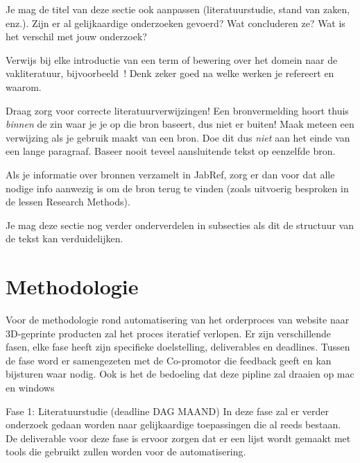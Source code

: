Je mag de titel van deze sectie ook aanpassen (literatuurstudie, stand van zaken, enz.). Zijn er al gelijkaardige onderzoeken gevoerd? Wat concluderen ze? Wat is het verschil met jouw onderzoek?

Verwijs bij elke introductie van een term of bewering over het domein naar de vakliteratuur, bijvoorbeeld~\autocite{Hykes2013}! Denk zeker goed na welke werken je refereert en waarom.

Draag zorg voor correcte literatuurverwijzingen! Een bronvermelding hoort thuis \emph{binnen} de zin waar je je op die bron baseert, dus niet er buiten! Maak meteen een verwijzing als je gebruik maakt van een bron. Doe dit dus \emph{niet} aan het einde van een lange paragraaf. Baseer nooit teveel aansluitende tekst op eenzelfde bron.

Als je informatie over bronnen verzamelt in JabRef, zorg er dan voor dat alle nodige info aanwezig is om de bron terug te vinden (zoals uitvoerig besproken in de lessen Research Methods).


Je mag deze sectie nog verder onderverdelen in subsecties als dit de structuur van de tekst kan verduidelijken.

\section{Methodologie}%
\label{sec:methodologie}

Voor de methodologie rond automatisering van het orderproces van website naar 3D-geprinte producten zal het proces iteratief verlopen. Er zijn verschillende fasen, elke fase heeft zijn specifieke doelstelling, deliverables en deadlines. Tussen de fase word er samengezeten met de Co-promotor die feedback geeft en kan bijsturen waar nodig. Ook is het de bedoeling dat deze pipline zal draaien op mac en windows 

Fase 1: Literatuurstudie (deadline DAG MAAND)
In deze fase zal er verder onderzoek gedaan worden naar gelijkaardige toepassingen die al reeds bestaan. De deliverable voor deze fase is ervoor zorgen dat er een lijst wordt gemaakt met tools die gebruikt zullen worden voor de automatisering.


